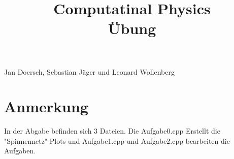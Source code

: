 \documentclass[a4paper, 12pt]{article}
\begin{document}
\title{
\textbf{Computatinal Physics\\
Übung}
}
\date{}
\maketitle

\begin{center}
Jan Doersch, Sebastian Jäger und Leonard Wollenberg
\end{center}
\section*{Anmerkung}
In der Abgabe befinden sich 3 Dateien.
Die Aufgabe0.cpp Erstellt die "Spinnennetz"-Plots und Aufgabe1.cpp und Aufgabe2.cpp bearbeiten die Aufgaben.

\newpage

\end{document}
